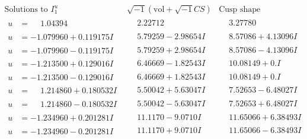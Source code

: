 \documentclass[1p]{elsarticle_modified}
\theoremstyle{definition}
\newcommand{\I}{\sqrt{-1}}
\begin{document}
$$\begin{array}{c|c|c}  
\text{Solutions to }I^u_{1}& \I (\text{vol} + \sqrt{-1}CS) & \text{Cusp shape}\\
 \hline 
\begin{aligned}
u &= \phantom{-}1.04394\phantom{ +0.000000I}\end{aligned}
 & \phantom{-}2.22712\phantom{ +0.000000I} & \phantom{-}3.27780\phantom{ +0.000000I} \\ \hline\begin{aligned}
u &= -1.079960 + 0.119175 I\end{aligned}
 & \phantom{-}5.79259 - 2.98654 I & \phantom{-}8.57086 + 4.13096 I \\ \hline\begin{aligned}
u &= -1.079960 - 0.119175 I\end{aligned}
 & \phantom{-}5.79259 + 2.98654 I & \phantom{-}8.57086 - 4.13096 I \\ \hline\begin{aligned}
u &= -1.213500 + 0.129016 I\end{aligned}
 & \phantom{-}6.46669 - 1.82543 I & \phantom{-}10.08149 + 0. I\phantom{ +0.000000I} \\ \hline\begin{aligned}
u &= -1.213500 - 0.129016 I\end{aligned}
 & \phantom{-}6.46669 + 1.82543 I & \phantom{-}10.08149 + 0. I\phantom{ +0.000000I} \\ \hline\begin{aligned}
u &= \phantom{-}1.214860 + 0.180532 I\end{aligned}
 & \phantom{-}5.50042 + 5.63047 I & \phantom{-}7.52653 - 6.48027 I \\ \hline\begin{aligned}
u &= \phantom{-}1.214860 - 0.180532 I\end{aligned}
 & \phantom{-}5.50042 - 5.63047 I & \phantom{-}7.52653 + 6.48027 I \\ \hline\begin{aligned}
u &= -1.234960 + 0.201281 I\end{aligned}
 & \phantom{-}11.1170 - 9.0710 I & \phantom{-}11.65066 + 6.38493 I \\ \hline\begin{aligned}
u &= -1.234960 - 0.201281 I\end{aligned}
 & \phantom{-}11.1170 + 9.0710 I & \phantom{-}11.65066 - 6.38493 I \\ \hline\begin{aligned}

\end{aligned}
\end{array}$$
\end{document}
